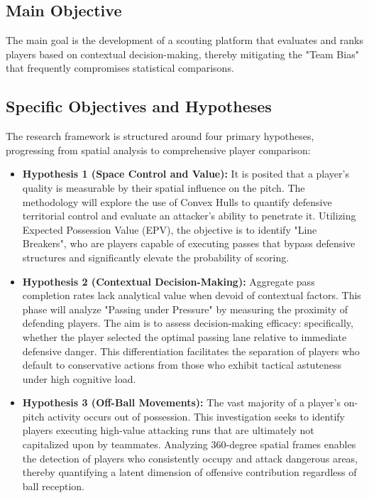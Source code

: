 \documentclass[12pt,a4paper]{article}
\begin{document}
\subsection{Main Objective}
The main goal is the development of a scouting platform that evaluates and ranks players based on contextual decision-making, thereby mitigating the "Team Bias" that frequently compromises statistical comparisons.

\subsection{Specific Objectives and Hypotheses}
The research framework is structured around four primary hypotheses, progressing from spatial analysis to comprehensive player comparison:

\begin{itemize}
    \item \textbf{Hypothesis 1 (Space Control and Value):} It is posited that a player's quality is measurable by their spatial influence on the pitch. The methodology will explore the use of Convex Hulls to quantify defensive territorial control and evaluate an attacker's ability to penetrate it. Utilizing Expected Possession Value (EPV), the objective is to identify "Line Breakers", who are players capable of executing passes that bypass defensive structures and significantly elevate the probability of scoring.
    \item \textbf{Hypothesis 2 (Contextual Decision-Making):} Aggregate pass completion rates lack analytical value when devoid of contextual factors. This phase will analyze "Passing under Pressure" by measuring the proximity of defending players. The aim is to assess decision-making efficacy: specifically, whether the player selected the optimal passing lane relative to immediate defensive danger. This differentiation facilitates the separation of players who default to conservative actions from those who exhibit tactical astuteness under high cognitive load.
    \item \textbf{Hypothesis 3 (Off-Ball Movements):} The vast majority of a player's on-pitch activity occurs out of possession. This investigation seeks to identify players executing high-value attacking runs that are ultimately not capitalized upon by teammates. Analyzing 360-degree spatial frames enables the detection of players who consistently occupy and attack dangerous areas, thereby quantifying a latent dimension of offensive contribution regardless of ball reception.

\end{itemize}
\end{document}
